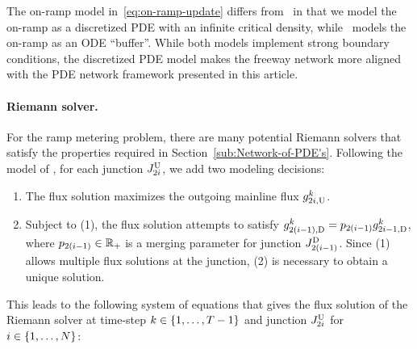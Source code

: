 The on-ramp model in~\eqref{eq:on-ramp-update} differs from~\cite{Monache2014PdeOde}
in that we model the on-ramp as a discretized PDE with an infinite
critical density, while~\cite{Monache2014PdeOde} models the on-ramp
as an ODE ``buffer''. While both models implement strong boundary
conditions, the discretized PDE model makes the freeway network more
aligned with the PDE network framework presented in this article.


\paragraph{Riemann solver.}

For the ramp metering problem, there are many potential Riemann solvers
that satisfy the properties required in Section~\ref{sub:Network-of-PDE's}.
Following the model of \cite{Monache2014PdeOde}, for each junction $J_{2i}^{\text{U}}$,
we add two modeling decisions:
\begin{enumerate}
\item The flux solution maximizes the outgoing mainline flux $g_{2i,\text{U}}^{k}$.
\item Subject to (1), the flux solution attempts to satisfy $g_{2\left(i-1\right),\text{D}}^{k}=p_{2(i-1)}g_{2i-1,\text{D}}^{k}$,
where $p_{2(i-1)}\in\mathbb{R}_{+}$ is a merging parameter for
junction $J_{2\left(i-1\right)}^{\text{D}}$. Since (1) allows multiple
flux solutions at the junction, (2) is necessary to obtain a unique
solution.
\end{enumerate}


This leads to the following system of equations that gives the flux
solution of the Riemann solver at time-step $k\in\left\{ 1,\ldots,T-1\right\}$
and junction $J_{2i}^{\text{U}}$ for $i\in\left\{ 1,\ldots,N\right\}$:

